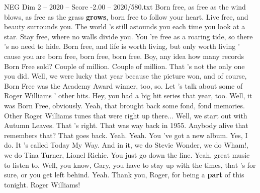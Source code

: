 \begin{textsample}{NEG Dim 2 – 2020 – Score -2.00 – 2020/580.txt}  \label{ex:f2_neg_027}
Born free, as free as the wind blows, as free as the grass \textbf{grows}, born free to follow your heart.
Live free, and beauty surrounds you.
The world 's still astounds you each time you look at a star.
Stay free, where no walls divide you.
You 're free as a roaring tide, so there 's no need to hide.
Born free, and life is worth living, but only worth living ' cause you are born free, born free, born free.
Boy, any idea how many records Born Free sold?
Couple of million.
Couple of million.
That 's not the only one you did.
Well, we were lucky that year because the picture won, and of course, Born Free was the Academy Award winner, too, so.
Let 's talk about some of Roger Williams ' other hits.
Hey, you had a big hit series that year, too.
Well, it was Born Free, obviously.
Yeah, that brought back some fond, fond memories.
Other Roger Williams tunes that were right up there...
Well, we start out with Autumn Leaves.
That 's right.
That was way back in 1955.
Anybody alive that remembers that?
That goes back.
Yeah.
Yeah.
You 've got a new album.
Yes, I do.
It 's called Today My Way.
And in it, we do Stevie Wonder, we do Wham!, we do Tina Turner, Lionel Richie.
You just go down the line.
Yeah, great music to listen to.
Well, you know, Gary, you have to stay up with the times, that 's for sure, or you get left behind.
Yeah.
Thank you, Roger, for being a \textbf{part} of this tonight.
Roger Williams!

\end{textsample}
